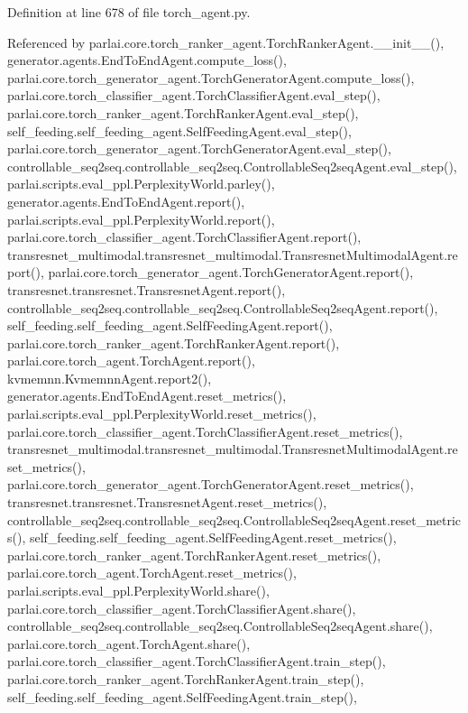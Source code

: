 Definition at line 678 of file torch\+\_\+agent.\+py.



Referenced by parlai.\+core.\+torch\+\_\+ranker\+\_\+agent.\+Torch\+Ranker\+Agent.\+\_\+\+\_\+init\+\_\+\+\_\+(), generator.\+agents.\+End\+To\+End\+Agent.\+compute\+\_\+loss(), parlai.\+core.\+torch\+\_\+generator\+\_\+agent.\+Torch\+Generator\+Agent.\+compute\+\_\+loss(), parlai.\+core.\+torch\+\_\+classifier\+\_\+agent.\+Torch\+Classifier\+Agent.\+eval\+\_\+step(), parlai.\+core.\+torch\+\_\+ranker\+\_\+agent.\+Torch\+Ranker\+Agent.\+eval\+\_\+step(), self\+\_\+feeding.\+self\+\_\+feeding\+\_\+agent.\+Self\+Feeding\+Agent.\+eval\+\_\+step(), parlai.\+core.\+torch\+\_\+generator\+\_\+agent.\+Torch\+Generator\+Agent.\+eval\+\_\+step(), controllable\+\_\+seq2seq.\+controllable\+\_\+seq2seq.\+Controllable\+Seq2seq\+Agent.\+eval\+\_\+step(), parlai.\+scripts.\+eval\+\_\+ppl.\+Perplexity\+World.\+parley(), generator.\+agents.\+End\+To\+End\+Agent.\+report(), parlai.\+scripts.\+eval\+\_\+ppl.\+Perplexity\+World.\+report(), parlai.\+core.\+torch\+\_\+classifier\+\_\+agent.\+Torch\+Classifier\+Agent.\+report(), transresnet\+\_\+multimodal.\+transresnet\+\_\+multimodal.\+Transresnet\+Multimodal\+Agent.\+report(), parlai.\+core.\+torch\+\_\+generator\+\_\+agent.\+Torch\+Generator\+Agent.\+report(), transresnet.\+transresnet.\+Transresnet\+Agent.\+report(), controllable\+\_\+seq2seq.\+controllable\+\_\+seq2seq.\+Controllable\+Seq2seq\+Agent.\+report(), self\+\_\+feeding.\+self\+\_\+feeding\+\_\+agent.\+Self\+Feeding\+Agent.\+report(), parlai.\+core.\+torch\+\_\+ranker\+\_\+agent.\+Torch\+Ranker\+Agent.\+report(), parlai.\+core.\+torch\+\_\+agent.\+Torch\+Agent.\+report(), kvmemnn.\+Kvmemnn\+Agent.\+report2(), generator.\+agents.\+End\+To\+End\+Agent.\+reset\+\_\+metrics(), parlai.\+scripts.\+eval\+\_\+ppl.\+Perplexity\+World.\+reset\+\_\+metrics(), parlai.\+core.\+torch\+\_\+classifier\+\_\+agent.\+Torch\+Classifier\+Agent.\+reset\+\_\+metrics(), transresnet\+\_\+multimodal.\+transresnet\+\_\+multimodal.\+Transresnet\+Multimodal\+Agent.\+reset\+\_\+metrics(), parlai.\+core.\+torch\+\_\+generator\+\_\+agent.\+Torch\+Generator\+Agent.\+reset\+\_\+metrics(), transresnet.\+transresnet.\+Transresnet\+Agent.\+reset\+\_\+metrics(), controllable\+\_\+seq2seq.\+controllable\+\_\+seq2seq.\+Controllable\+Seq2seq\+Agent.\+reset\+\_\+metrics(), self\+\_\+feeding.\+self\+\_\+feeding\+\_\+agent.\+Self\+Feeding\+Agent.\+reset\+\_\+metrics(), parlai.\+core.\+torch\+\_\+ranker\+\_\+agent.\+Torch\+Ranker\+Agent.\+reset\+\_\+metrics(), parlai.\+core.\+torch\+\_\+agent.\+Torch\+Agent.\+reset\+\_\+metrics(), parlai.\+scripts.\+eval\+\_\+ppl.\+Perplexity\+World.\+share(), parlai.\+core.\+torch\+\_\+classifier\+\_\+agent.\+Torch\+Classifier\+Agent.\+share(), controllable\+\_\+seq2seq.\+controllable\+\_\+seq2seq.\+Controllable\+Seq2seq\+Agent.\+share(), parlai.\+core.\+torch\+\_\+agent.\+Torch\+Agent.\+share(), parlai.\+core.\+torch\+\_\+classifier\+\_\+agent.\+Torch\+Classifier\+Agent.\+train\+\_\+step(), parlai.\+core.\+torch\+\_\+ranker\+\_\+agent.\+Torch\+Ranker\+Agent.\+train\+\_\+step(), self\+\_\+feeding.\+self\+\_\+feeding\+\_\+agent.\+Self\+Feeding\+Agent.\+train\+\_\+step(), 